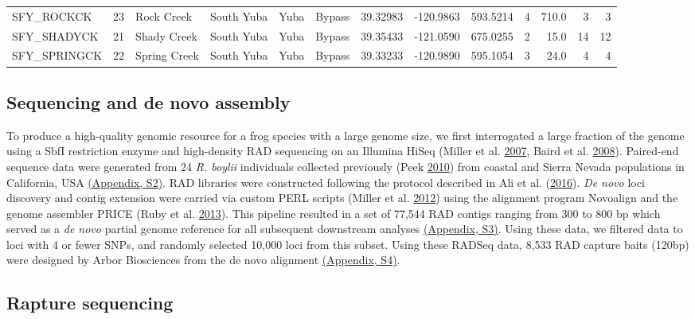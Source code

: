 \documentclass[proquest,12pt,final]{ucthesis-CA2012} %
\begin{document}
\begin{ucmainmatter}
\begin{landscape}
\begin{table}
{\begin{tabular}[t]{lrllllrrrrrrr}
SFY\_ROCKCK & 23 & Rock Creek & South Yuba & Yuba & Bypass & 39.32983 & -120.9863 & 593.5214 & 4 & 710.0 & 3 & 3\\
SFY\_SHADYCK & 21 & Shady Creek & South Yuba & Yuba & Bypass & 39.35433 & -121.0590 & 675.0255 & 2 & 15.0 & 14 & 12\\
SFY\_SPRINGCK & 22 & Spring Creek & South Yuba & Yuba & Bypass & 39.33233 & -120.9890 & 595.1054 & 3 & 24.0 & 4 & 4\\
\bottomrule
\end{tabular}}
\end{table}
\end{landscape}
\hypertarget{denovo}{%
\subsection{Sequencing and de novo assembly}\label{denovo}}

To produce a high-quality genomic resource for a frog species with a
large genome size, we first interrogated a large fraction of the genome
using a SbfI restriction enzyme and high-density RAD sequencing on an
Illumina HiSeq (Miller et al.
\protect\hyperlink{ref-miller_rapid_2007}{2007}, Baird et al.
\protect\hyperlink{ref-baird_rapid_2008}{2008}). Paired-end sequence
data were generated from 24 \emph{R. boylii} individuals collected
previously (Peek \protect\hyperlink{ref-peek_landscape_2010}{2010}) from
coastal and Sierra Nevada populations in California, USA
\protect\hyperlink{supptables}{(Appendix, S2)}. RAD libraries were
constructed following the protocol described in Ali et al.
(\protect\hyperlink{ref-ali_rad_2016}{2016}). \emph{De novo} loci
discovery and contig extension were carried via custom PERL scripts
(Miller et al. \protect\hyperlink{ref-miller_conserved_2012}{2012})
using the alignment program Novoalign and the genome assembler PRICE
(Ruby et al. \protect\hyperlink{ref-ruby_price_2013}{2013}). This
pipeline resulted in a set of 77,544 RAD contigs ranging from 300 to 800
bp which served as a \emph{de novo} partial genome reference for all
subsequent downstream analyses \protect\hyperlink{supptables}{(Appendix,
S3)}. Using these data, we filtered data to loci with 4 or fewer SNPs,
and randomly selected 10,000 loci from this subset. Using these RADSeq
data, 8,533 RAD capture baits (120bp) were designed by Arbor Biosciences
from the de novo alignment \protect\hyperlink{supptables}{(Appendix,
S4)}.

\hypertarget{rapture}{%
\subsection{Rapture sequencing}\label{rapture}}


\end{ucmainmatter}
\end{document}
